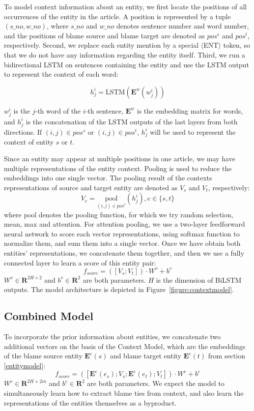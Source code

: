 \documentclass[letterpaper]{article} %
\begin{document}
To model context information about an entity, we first locate the positions of all occurrences of the entity in the article. A position is represented by a tuple $(s\_no, w\_no)$, where $s\_no$ and $w\_no$ denotes sentence number and word number, and the positions of blame source and blame target are denoted as $pos^s$ and $pos^t$, respectively. Second, we replace each entity mention by a special $\langle$ENT$\rangle$ token, so that we do not have any information regarding the entity itself. Third, we run a bidirectional LSTM on sentences containing the entity and use the LSTM output to represent the context of each word:

$$h^i_j=\mathrm{LSTM}(\mathbf{E}^w(w^i_j))$$

$w^i_j$ is the $j$-th word of the $i$-th sentence, $\mathbf{E}^w$ is the embedding matrix for words, and $h^i_j$ is the concatenation of the LSTM outputs of the last layers from both directions. If $(i, j) \in pos^s$ or $(i, j) \in pos^t$, $h^i_j$ will be used to represent the context of entity $s$ or $t$.

Since an entity may appear at multiple positions in one article, we may have multiple representations of the entity context. Pooling is used to reduce the embeddings into one single vector. The pooling result of the contexts representations of source and target entity are denoted as $V_s$ and $V_t$, respectively: $$V_e = \underset{(i, j) \in pos^e} {\mathrm{pool}} (h^i_j), e \in \{s, t\}$$where $\mathrm{pool}$ denotes the pooling function, for which we try random selection, mean, max and attention. For attention pooling, we use a two-layer feedforward neural network to score each vector representations, using softmax function to normalize them, and sum them into a single vector. Once we have obtain both entities' representations, we concatenate them together, and then we use a fully connected layer to learn a score of this entity pair: $$f_{score} = ([V_s; V_t]) \cdot W^v + b^v $$ $W^v \in \mathbf{R}^{2H \times 2}$ and $b^v \in \mathbf{R}^{2}$ are both parameters. $H$ is the dimension of BiLSTM outputs. The model architecture is depicted in Figure~\ref{figure:contextmodel}.

\subsection{Combined Model}

To incorporate the prior information about entities, we concatenate two additional vectors on the basis of the Context Model, which are the embeddings of the blame source entity $\mathbf{E}^e(s)$ and blame target entity $\mathbf{E}^e(t)$ from section \ref{entitymodel}: $$f_{score} = ([\mathbf{E}^e(e_s); V_s; \mathbf{E}^e(e_t); V_t]) \cdot W^c + b^c $$ $W^c \in \mathbf{R}^{2H + 2m}$ and $b^c \in \mathbf{R}^{2}$ are both parameters. We expect the model to simultaneously learn how to extract blame ties from context, and also learn the representations of the entities themselves as a byproduct.
\end{document}
